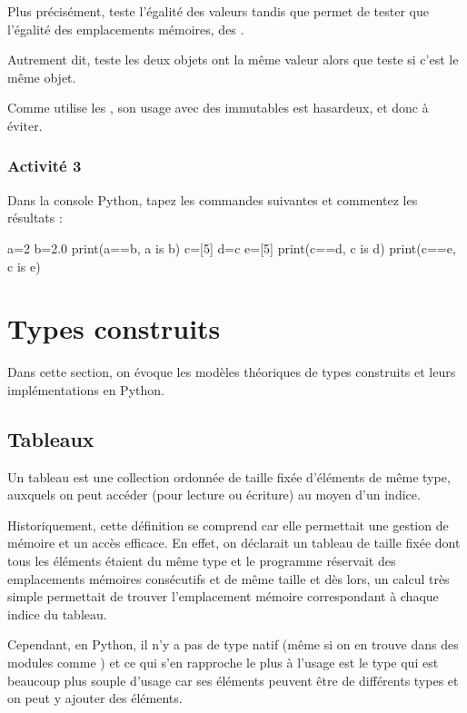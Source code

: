 \documentclass[11pt,a4paper,french,twoside]{PMCours}
\begin{document}
Plus précisément, \code{==} teste l'égalité des valeurs tandis que  
permet de tester que l'égalité des emplacements mémoires, des .

Autrement dit, \code{==} teste les deux objets ont la même valeur alors que 
 teste si c'est le même objet. 

\warning{} Comme  utilise les , son usage avec des immutables est
hasardeux, et donc à éviter. 

\subsubsection*{Activité 3}
Dans la console Python, tapez les commandes suivantes et commentez les résultats :
\begin{Python}
a=2
b=2.0
print(a==b, a is b)
c=[5]
d=c
e=[5]
print(c==d, c is d)
print(c==e, c is e)
\end{Python}


\section{Types construits}
Dans cette section, on évoque les modèles théoriques de types construits et leurs 
implémentations en Python. 
\subsection{Tableaux}
\begin{Definition}{}
Un tableau est une collection ordonnée de taille fixée d'éléments de même type, 
auxquels on peut accéder (pour lecture ou écriture) au moyen d'un indice.  
\end{Definition}

\medskip
Historiquement, cette définition se comprend car elle permettait
une gestion de mémoire et un accès efficace.
En effet, on déclarait un tableau de taille fixée dont tous les éléments étaient 
du même type et le programme réservait des emplacements mémoires consécutifs 
et de même taille et dès lors, un calcul très simple permettait de trouver 
l'emplacement mémoire correspondant à chaque indice du tableau.

\medskip
Cependant, en Python, il n'y a pas de type  natif (même si on en 
trouve dans des modules comme ) et ce qui s'en rapproche le plus à 
l'usage est le type   
qui est beaucoup plus souple d'usage car ses éléments peuvent être de différents 
types et on peut y ajouter des éléments.
\end{document}
